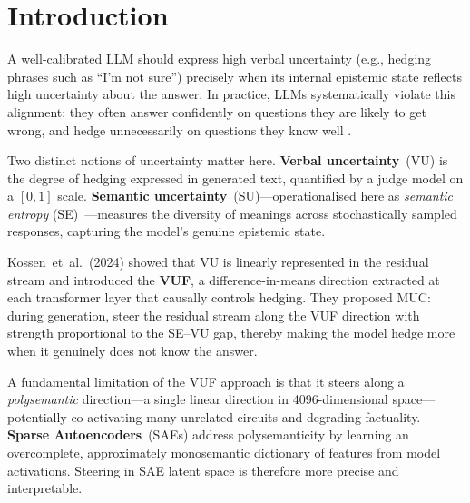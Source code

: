 \documentclass{article}
\begin{document}
\section{Introduction}
\label{sec:intro}

A well-calibrated LLM should express high verbal uncertainty (e.g., hedging
phrases such as ``I'm not sure'') precisely when its internal epistemic state
reflects high uncertainty about the answer.  In practice, LLMs systematically
violate this alignment: they often answer confidently on questions they are
likely to get wrong, and hedge unnecessarily on questions they know well
\citep{kossen2024vcal}.

Two distinct notions of uncertainty matter here.  \textbf{Verbal
uncertainty}~(VU) is the degree of hedging expressed in generated text,
quantified by a judge model on a $[0,1]$ scale.  \textbf{Semantic
uncertainty}~(SU)---operationalised here as \emph{semantic entropy}
(SE)~\citep{kuhn2023se}---measures the diversity of meanings across stochastically
sampled responses, capturing the model's genuine epistemic state.

Kossen~et~al.\ (2024) showed that VU is linearly represented in the residual
stream and introduced the \textbf{VUF}, a difference-in-means direction
extracted at each transformer layer that causally controls hedging.  They
proposed MUC: during generation, steer the residual stream along the VUF
direction with strength proportional to the SE--VU gap, thereby making the
model hedge more when it genuinely does not know the answer.

A fundamental limitation of the VUF approach is that it steers along a
\emph{polysemantic} direction---a single linear direction in 4096-dimensional
space---potentially co-activating many unrelated circuits and degrading
factuality.  \textbf{Sparse Autoencoders}~(SAEs) \citep{bricken2023monosemanticity,
cunningham2023sparse} address polysemanticity by learning an overcomplete,
approximately monosemantic dictionary of features from model activations.
Steering in SAE latent space is therefore more precise and interpretable.
\end{document}

